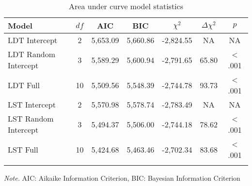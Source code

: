 \documentclass[english,man]{apa6}
\theoremstyle{definition}
\theoremstyle{definition}
\theoremstyle{definition}
\theoremstyle{remark}
\begin{document}
\begin{table}[tbp]
\begin{center}
\begin{threeparttable}
\caption{\label{tab:area-table-model}Area under curve model statistics}
\begin{tabular}{lcccccc}
\toprule
Model & $df$ & AIC & BIC & $\chi^2$ & $\Delta\chi^2$ & $p$\\
\midrule
LDT Intercept & 2 & 5,653.09 & 5,660.86 & -2,824.55 & NA & NA\\
LDT Random Intercept & 3 & 5,589.29 & 5,600.94 & -2,791.65 & 65.80 & < .001\\
LDT Full & 10 & 5,509.56 & 5,548.39 & -2,744.78 & 93.73 & < .001\\
LST Intercept & 2 & 5,570.98 & 5,578.74 & -2,783.49 & NA & NA\\
LST Random Intercept & 3 & 5,494.37 & 5,506.00 & -2,744.18 & 78.62 & < .001\\
LST Full & 10 & 5,424.68 & 5,463.46 & -2,702.34 & 83.68 & < .001\\
\bottomrule
\addlinespace
\end{tabular}
\begin{tablenotes}[para]
\textit{Note.} AIC: Aikaike Information Criterion, BIC: Bayesian Information Criterion
\end{tablenotes}
\end{threeparttable}
\end{center}
\end{table}
\end{document}
